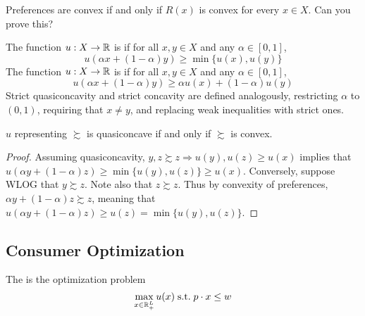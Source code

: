 \documentclass[12pt]{article}
\begin{document}
\begin{remark}
	Preferences are convex if and only if $R(x)$ is convex for every $x \in X$. Can you prove this?
\end{remark}

\begin{definition}
	The function $u: X \to \mathbb{R}$ is  if for all $x,y \in X$ and any $\alpha \in [0,1]$,
	\[
	u(\alpha x + (1-\alpha)y) \ge \min\{u(x),u(y)\}
	\]
	The function $u: X \to \mathbb{R}$ is  if for all $x,y \in X$ and any $\alpha \in [0,1]$,
	\[
	u(\alpha x + (1-\alpha)y) \ge \alpha u(x) + (1-\alpha)u(y)
	\]
	Strict quasiconcavity and strict concavity are defined analogously, restricting $\alpha$ to $(0,1)$, requiring that $x \ne y$, and replacing weak inequalities with strict ones.
\end{definition}
\begin{proposition}\label{prop:quasiconcave_convex}
	$u$ representing $\succsim$ is quasiconcave if and only if $\succsim$ is convex.
\end{proposition}
\begin{proof}
	Assuming quasiconcavity, $y,z \succsim z \Longrightarrow u(y),u(z) \ge u(x)$ implies that $u(\alpha y + (1-\alpha)z) \ge \min\{u(y),u(z)\} \ge u(x)$. Conversely, suppose WLOG that $y \succsim z$. Note also that $z \succsim z$. Thus by convexity of preferences, $\alpha y + (1-\alpha)z \succsim z$, meaning that $u(\alpha y + (1-\alpha)z) \ge u(z) = \min\{u(y),u(z)\}$.
\end{proof}

\subsection{Consumer Optimization}

\begin{definition}
	The  is the optimization problem
	\[
	\max_{x \in \mathbb{R}^L_+} u(x) \;\text{s.t.}\; p \cdot x \le w
	\]
\end{definition}
\end{document}
